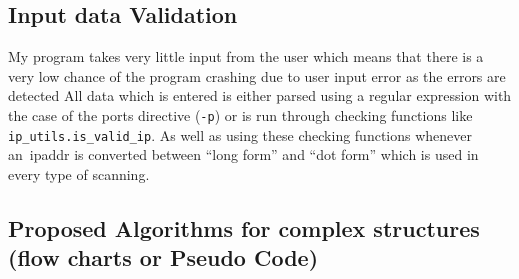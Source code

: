 \documentclass[titlepage]{article}
\let\Oldsubsection\subsection{}
\renewcommand{\subsection}{\FloatBarrier\Oldsubsection}
\begin{document}
\subsection{Input data Validation}

My program takes very little input from the user which means that there is a very low chance of the 
program crashing due to user input error as the errors are detected All data which is entered is 
either parsed using a regular expression with the case of the \glspl{port} directive (\verb|-p|) or 
is run through checking functions like \verb|ip_utils.is_valid_ip|. As well as using these checking 
functions whenever an~\gls{ipaddr} is converted between ``long form'' and ``dot form'' which is used 
in every type of scanning.

\subsection{Proposed Algorithms for complex structures (flow charts or Pseudo Code)}

\begin{algorithm}
  \caption{%
  My algorithm for turning a \gls{cidr} specified \gls{subnet} into a list of actual \gls{ipaddr}es
}\label{ip_range}
  \begin{algorithmic}[1]
    \EndFor{}
    \EndFor{}
    \EndProcedure{}
  \end{algorithmic}
\end{algorithm}
\end{document}
